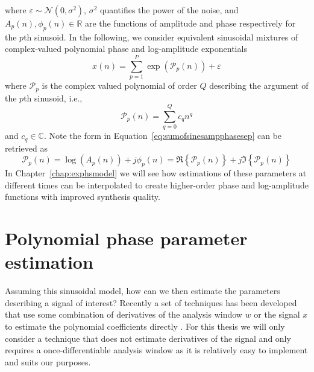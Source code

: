 where $\varepsilon \sim \mathcal{N}(0,\sigma^{2})$, $\sigma^{2}$ quantifies the
power of the noise, and $A_{p}(n),\phi_{p}(n) \in \mathbb{R}$ are the functions of
amplitude and phase respectively for the $p$th sinusoid. In the following, we
consider equivalent sinusoidal mixtures of complex-valued polynomial phase and
log-amplitude exponentials
\[
    x(n)=\sum_{p=1}^{P} \exp(\mathcal{P}_p(n)) + \varepsilon
\]
where $\mathcal{P}_p$ is the complex valued polynomial of order $Q$ describing
the argument of the $p$th sinusoid, i.e.,
\[
    \mathcal{P}_p(n) = \sum_{q=0}^{Q} c_q n^{q}
\]
and $c_q \in \mathbb{C}$. Note the form in
Equation~\ref{eq:sumofsinesampphasesep} can be retrieved as
\[
    \mathcal{P}_p(n) = \log(A_p(n)) +  j \phi_p(n) =
    \Re\left\{\mathcal{P}_p(n)\right\} +
    j\Im\left\{\mathcal{P}_p(n)\right\}
\]
In Chapter~\ref{chap:exphsmodel} we will see how estimations of these parameters
at different times can be interpolated to create higher-order phase and
log-amplitude functions
with improved synthesis quality.

\section{Polynomial phase parameter estimation}
\label{sec:ddm_description}
Assuming this sinusoidal model, how can we then
estimate the parameters describing a signal of interest? Recently a set of
techniques has been developed that use some combination of derivatives of the
analysis window $w$ or the signal $x$ to estimate the polynomial coefficients
directly \cite{hamilton2011non}. For this thesis we will only consider a
technique that does not estimate derivatives of the signal and only requires a
once-differentiable analysis window as it is relatively easy to implement and
suits our purposes.

